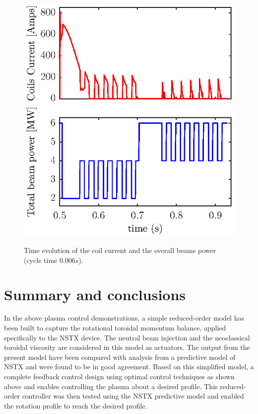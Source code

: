 \documentclass{iopart}
\begin{document}
\begin{figure}
	\centering
	\includegraphics{fig18a}  \\[-0.5em] %
	\includegraphics{fig18b} 
	\caption{Time evolution of the coil current and the overall beams power (cycle time $0.006 s$). }
	\label{fig:rot17}
\end{figure}


\section{Summary and conclusions}
\label{sec:conclusions}

In the above plasma control demonstrations, a simple reduced-order model has been built to capture the rotational toroidal momentum balance, applied specifically to the NSTX device. The neutral beam injection and the neoclassical toroidal viscosity are considered in this model as actuators. The output from the present model have been compared with analysis from a predictive model of NSTX and were found to be in good agreement.
Based on this simplified model, a complete feedback control design using optimal control techniques as shown above and enables controlling the plasma about a desired profile. This reduced-order controller was then tested using the NSTX predictive model and enabled the rotation profile to reach the desired profile.
\end{document}
